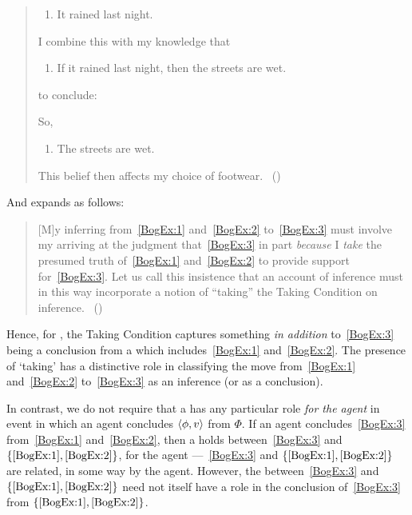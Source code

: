 \begin{note}
\begin{quote}
    \begin{enumerate}[label=(\arabic*), ref=(\arabic*), series=BogEx]
    \item
      \label{BogEx:1}
      It rained last night.
    \end{enumerate}

    I combine this with my knowledge that

    \begin{enumerate}[label=(\arabic*), ref=(\arabic*), resume*=BogEx]
    \item
      \label{BogEx:2}
      If it rained last night, then the streets are wet.
    \end{enumerate}

    to conclude:

    So,

    \begin{enumerate}[label=(\arabic*), ref=(\arabic*), resume*=BogEx]
    \item
      \label{BogEx:3}
      The streets are wet.
    \end{enumerate}
    This belief then affects my choice of footwear.%
    \mbox{ }\hfill\mbox{(\citeyear[2]{Boghossian:2014aa})}
  \end{quote}

  And \citeauthor{Boghossian:2014aa} expands as follows:

  \begin{quote}
    [M]y inferring from~\ref{BogEx:1} and~\ref{BogEx:2} to~\ref{BogEx:3} must involve my arriving at the judgment that~\ref{BogEx:3} in part \emph{because} I \emph{take} the presumed truth of~\ref{BogEx:1} and~\ref{BogEx:2} to provide support for~\ref{BogEx:3}.
    Let us call this insistence that an account of inference must in this way incorporate a notion of ``taking'' the Taking Condition on inference.%
    \mbox{ }\hfill\mbox{(\citeyear[4]{Boghossian:2014aa})}
  \end{quote}

  Hence, for \citeauthor{Boghossian:2014aa}, the Taking Condition captures something \emph{in addition} to~\ref{BogEx:3} being a conclusion from a \poP{} which includes~\ref{BogEx:1} and~\ref{BogEx:2}.
  The presence of `taking' has a distinctive role in classifying the move from~\ref{BogEx:1} and~\ref{BogEx:2} to~\ref{BogEx:3} as an inference (or as a conclusion).

  In contrast, we do not require that a \ros{} has any particular role \emph{for the agent} in event in which an agent concludes \(\langle \phi, v \rangle\) from \(\Phi\).
  If an agent concludes~\ref{BogEx:3} from~\ref{BogEx:1} and~\ref{BogEx:2}, then a \ros{} holds between~\ref{BogEx:3} and \(\{\ref{BogEx:1}, \ref{BogEx:2}\}\), for the agent ---~\ref{BogEx:3} and \(\{\ref{BogEx:1}, \ref{BogEx:2}\}\) are related, in some way by the agent.
  However, the \ros{} between~\ref{BogEx:3} and \(\{\ref{BogEx:1}, \ref{BogEx:2}\}\) need not itself have a role in the \agents{} conclusion of~\ref{BogEx:3} from \(\{\ref{BogEx:1}, \ref{BogEx:2}\}\).
\end{note}

